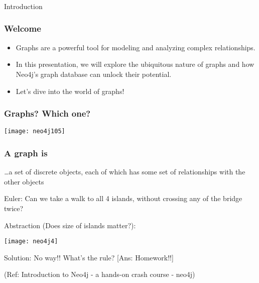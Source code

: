 \begin{frame}[fragile]\frametitle{}
\begin{center}
{\Large Introduction}
\end{center}
\end{frame}


\begin{frame}[fragile]\frametitle{Welcome}
  \vspace{0.5em}
  \begin{itemize}
    \item Graphs are a powerful tool for modeling and analyzing complex relationships.
    \item In this presentation, we will explore the ubiquitous nature of graphs and how Neo4j's graph database can unlock their potential.
    \item Let's dive into the world of graphs!
  \end{itemize}
\end{frame}


\begin{frame}[fragile]\frametitle{Graphs? Which one?}

  \begin{center}
    \texttt{[image: neo4j105]}
  \end{center}

\end{frame}


\begin{frame}[fragile]\frametitle{A graph is}
{\emph \ldots a set of discrete objects, each of which has some set of relationships with the other objects}

Euler: Can we take a walk to all 4 islands, without crossing any of the bridge twice?

Abstraction (Does size of islands matter?):

\begin{center}
\texttt{[image: neo4j4]}
\end{center}	  

Solution: No way!! What's the rule? [Ans: Homework!!]

{\tiny (Ref: Introduction to Neo4j - a hands-on crash course - neo4j)}
\end{frame}




